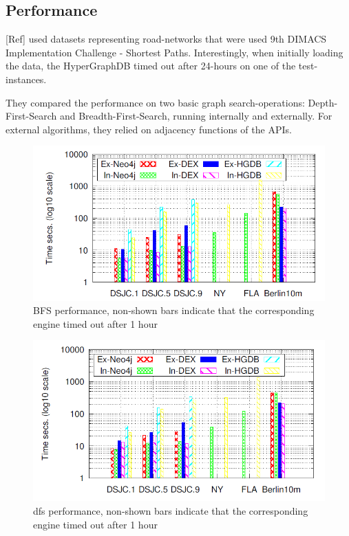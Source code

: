 \documentclass{acm_proc_article-sp}
\begin{document}
\subsection{Performance}

[Ref] used datasets representing road-networks that were used 9th DIMACS Implementation Challenge - Shortest Paths. Interestingly, when initially loading the data, the HyperGraphDB timed out after 24-hours on one of the test-instances.

They compared the performance on two basic graph search-operations: Depth-First-Search and Breadth-First-Search, running internally and externally. For external algorithms, they relied on adjacency functions of the APIs.

\begin{figure}[hbtp]
	\centering
	\includegraphics[scale=0.35]{bfs.png}
	\caption{BFS performance, non-shown bars indicate that
		the corresponding engine timed out after 1 hour}
\end{figure}

\begin{figure}[hbtp]
	\centering
	\includegraphics[scale=0.35]{dfs.png}
	\caption{dfs performance, non-shown bars indicate that
		the corresponding engine timed out after 1 hour}
\end{figure}
\end{document}
